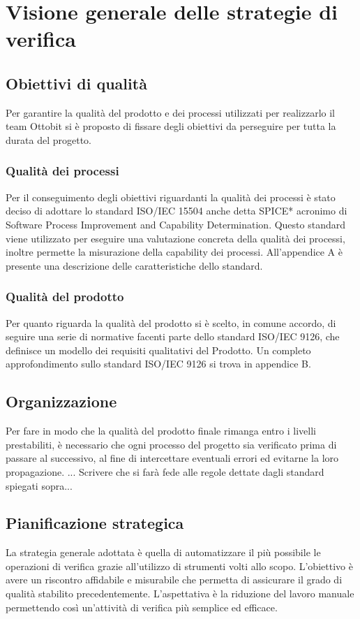 \section{Visione generale delle strategie di verifica}
\subsection{Obiettivi di qualità}
	Per garantire la qualità del prodotto e dei processi utilizzati per realizzarlo il team Ottobit si è proposto di fissare degli obiettivi da perseguire per tutta la durata del progetto.
	\subsubsection{Qualità dei processi}
	Per il conseguimento degli obiettivi riguardanti la qualità dei processi è stato deciso di adottare lo standard ISO/IEC 15504 anche detta SPICE* acronimo di Software Process Improvement and Capability Determination. Questo standard viene utilizzato per eseguire una valutazione concreta della qualità dei processi, inoltre permette la misurazione della capability dei processi. All'appendice A è presente una descrizione delle caratteristiche dello standard.
	\subsubsection{Qualità del prodotto}
		Per quanto riguarda la qualità del prodotto si è scelto, in comune accordo, di seguire una serie di normative facenti parte dello standard ISO/IEC 9126, che definisce un modello dei requisiti qualitativi del Prodotto. Un completo approfondimento sullo standard ISO/IEC 9126 si trova in appendice B.
\subsection{Organizzazione}
Per fare in modo che la qualità del prodotto finale rimanga entro i livelli prestabiliti, è necessario che ogni processo del progetto sia verificato prima di passare al successivo, al fine di intercettare eventuali errori ed evitarne la loro propagazione. 
... Scrivere che si farà fede alle regole dettate dagli standard spiegati sopra...

\subsection{Pianificazione strategica}
La strategia generale adottata è quella di automatizzare il più possibile le operazioni di verifica grazie all'utilizzo di strumenti volti allo scopo. L'obiettivo è avere un riscontro affidabile e misurabile che permetta di assicurare il grado di qualità stabilito precedentemente.  L'aspettativa è la riduzione del lavoro manuale permettendo così un'attività di verifica più semplice ed efficace.

